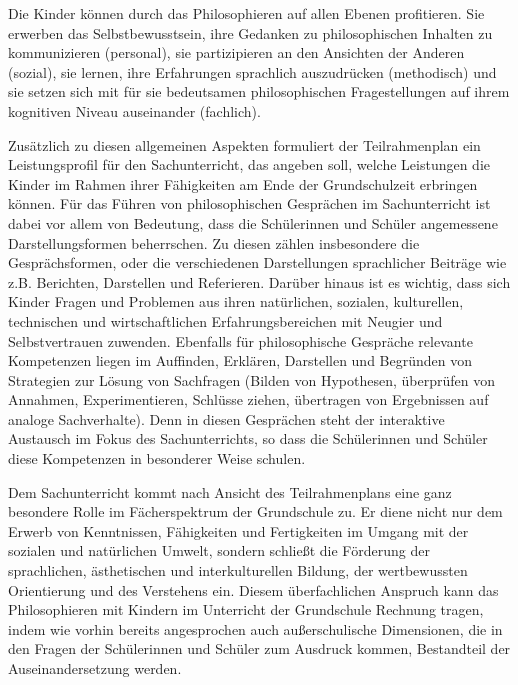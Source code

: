 Die Kinder können durch das Philosophieren auf allen Ebenen profitieren. 
Sie erwerben das Selbstbewusstsein, ihre Gedanken zu philosophischen Inhalten zu kommunizieren (personal), sie partizipieren an den Ansichten der Anderen (sozial), sie lernen, ihre Erfahrungen sprachlich auszudrücken (methodisch) und sie setzen sich mit für sie bedeutsamen philosophischen Fragestellungen auf ihrem kognitiven Niveau auseinander (fachlich).

Zusätzlich zu diesen allgemeinen Aspekten formuliert der Teilrahmenplan ein Leistungsprofil für den Sachunterricht, das angeben soll, welche Leistungen die Kinder im Rahmen ihrer Fähigkeiten am Ende der Grundschulzeit erbringen können. 
Für das Führen von philosophischen Gesprächen im Sachunterricht ist dabei vor allem von Bedeutung, dass die Schülerinnen und Schüler \glqq angemessene Darstellungsformen\grqq{}\cite[S.\,8]{MBFJ06} beherrschen.
Zu diesen zählen insbesondere die Gesprächsformen, oder die verschiedenen Darstellungen sprachlicher Beiträge wie z.B. Berichten, Darstellen und Referieren.
Darüber hinaus ist es wichtig, dass sich Kinder \glqq Fragen und Problemen aus ihren natürlichen, sozialen, kulturellen, technischen und wirtschaftlichen Erfahrungsbereichen mit Neugier und Selbstvertrauen\grqq{}\cite[S.\,8]{MBFJ06} zuwenden. 
Ebenfalls für philosophische Gespräche relevante Kompetenzen liegen im \glqq Auffinden, Erklären, Darstellen und Begründen von Strategien zur Lösung von Sachfragen (Bilden von Hypothesen, überprüfen von Annahmen, Experimentieren, Schlüsse ziehen, übertragen von Ergebnissen auf analoge Sachverhalte).\grqq{}\cite[S.\,8]{MBFJ06}
Denn in diesen Gesprächen steht der interaktive Austausch im Fokus des Sachunterrichts, so dass die Schülerinnen und Schüler diese Kompetenzen in besonderer Weise schulen.

Dem Sachunterricht kommt nach Ansicht des Teilrahmenplans eine ganz besondere Rolle im Fächerspektrum der Grundschule zu. 
Er diene \glqq nicht nur dem Erwerb von Kenntnissen, Fähigkeiten und Fertigkeiten im Umgang mit der sozialen und natürlichen Umwelt, sondern schließt die Förderung der sprachlichen, ästhetischen und interkulturellen Bildung, der wertbewussten Orientierung und des Verstehens ein.\grqq{}\cite[S.\,9]{MBFJ06} 
Diesem überfachlichen Anspruch kann das Philosophieren mit Kindern im Unterricht der Grundschule Rechnung tragen, indem wie vorhin bereits angesprochen auch außerschulische Dimensionen, die in den Fragen der Schülerinnen und Schüler zum Ausdruck kommen, Bestandteil der Auseinandersetzung werden.

